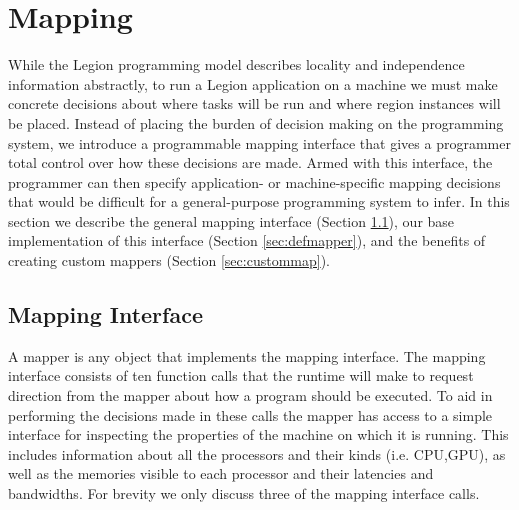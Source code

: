 \section{Mapping}
\label{sec:mapping}

While the Legion programming model describes locality and independence information abstractly,
to run a Legion application on a machine we must make concrete decisions about
where tasks will be run and where region instances will be placed.  Instead of placing
the burden of decision making on the programming system, we introduce a programmable mapping
interface that gives a programmer total control over how these decisions are made.  Armed
with this interface, the programmer can then specify application- or machine-specific
mapping decisions that would be difficult for a general-purpose programming system to infer.
In this section we describe the general mapping interface (Section \ref{sec:mapinterface}),
our base implementation of this interface (Section \ref{sec:defmapper}), and the benefits
of creating custom mappers (Section \ref{sec:custommap}).

\subsection{Mapping Interface}
\label{sec:mapinterface}
A mapper is any object that implements the mapping interface.  The mapping interface
consists of ten function calls that the runtime will make to request direction from
the mapper about how a program should be executed.  To aid in performing the 
decisions made in these calls the mapper has access to a simple 
interface for inspecting the properties of the machine on which it is running.  This includes 
information about all the processors and their kinds (i.e. CPU,GPU), as well as the memories visible
to each processor and their latencies and bandwidths.  For brevity we only
discuss three of the mapping interface calls.

